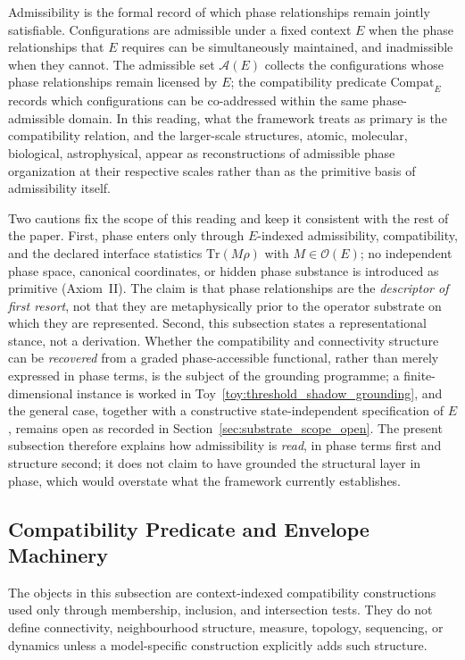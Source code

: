 \documentclass[aps,prx,onecolumn,11pt]{revtex4-2}
\theoremstyle{plain}
\theoremstyle{definition}
\theoremstyle{remark}
\begin{document}
Admissibility is the formal record of which phase relationships remain
jointly satisfiable. Configurations are admissible under a fixed context
\(E\) when the phase relationships that \(E\) requires can be
simultaneously maintained, and inadmissible when they cannot. The
admissible set \(\mathcal{A}(E)\) collects the configurations whose phase
relationships remain licensed by \(E\); the compatibility predicate
\(\mathrm{Compat}_E\) records which configurations can be co-addressed
within the same phase-admissible domain. In this reading, what the
framework treats as primary is the compatibility relation, and the
larger-scale structures, atomic, molecular, biological, astrophysical,
appear as reconstructions of admissible phase organization at their
respective scales rather than as the primitive basis of admissibility
itself.

Two cautions fix the scope of this reading and keep it consistent with
the rest of the paper. First, phase enters only through \(E\)-indexed
admissibility, compatibility, and the declared interface statistics
\(\mathrm{Tr}(M\rho)\) with \(M \in \mathcal{O}(E)\); no independent phase
space, canonical coordinates, or hidden phase substance is introduced as
primitive (Axiom~II). The claim is that phase relationships are the
\emph{descriptor of first resort}, not that they are metaphysically prior
to the operator substrate on which they are represented. Second, this
subsection states a representational stance, not a derivation. Whether
the compatibility and connectivity structure can be \emph{recovered} from
a graded phase-accessible functional, rather than merely expressed in
phase terms, is the subject of the grounding programme; a
finite-dimensional instance is worked in
Toy~\ref{toy:threshold_shadow_grounding}, and the general case, together
with a constructive state-independent specification of \(E\), remains
open as recorded in Section~\ref{sec:substrate_scope_open}. The present
subsection therefore explains how admissibility is \emph{read}, in phase
terms first and structure second; it does not claim to have grounded the
structural layer in phase, which would overstate what the framework
currently establishes.

\subsection{Compatibility Predicate and Envelope Machinery}
\label{subsec:core_compatibility_envelope_machinery}

The objects in this subsection are context-indexed compatibility
constructions used only through membership, inclusion, and intersection
tests. They do not define connectivity, neighbourhood structure,
measure, topology, sequencing, or dynamics unless a model-specific
construction explicitly adds such structure.
\end{document}
